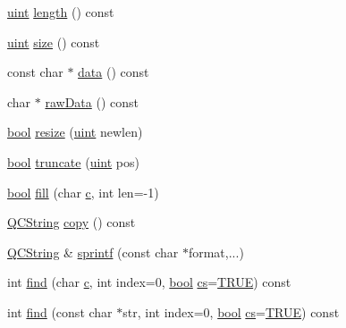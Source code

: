 \begin{DoxyCompactItemize}
\item 
\hyperlink{qglobal_8h_a4d3943ddea65db7163a58e6c7e8df95a}{uint} \hyperlink{class_q_c_string_a70bdaa04f2325aee395c4e1ccc1c942c}{length} () const 
\item 
\hyperlink{qglobal_8h_a4d3943ddea65db7163a58e6c7e8df95a}{uint} \hyperlink{class_q_c_string_aabd08432ddd836c2836b2ddfbfd8ed7c}{size} () const 
\item 
const char $\ast$ \hyperlink{class_q_c_string_a0079684d8dd531b96660e5ceefa3232d}{data} () const 
\item 
char $\ast$ \hyperlink{class_q_c_string_a94bb1d28e72852dec7547f5c8bad64bd}{raw\+Data} () const 
\item 
\hyperlink{qglobal_8h_a1062901a7428fdd9c7f180f5e01ea056}{bool} \hyperlink{class_q_c_string_a8402bb62a3a1c6a79130c3b3cf38b52c}{resize} (\hyperlink{qglobal_8h_a4d3943ddea65db7163a58e6c7e8df95a}{uint} newlen)
\item 
\hyperlink{qglobal_8h_a1062901a7428fdd9c7f180f5e01ea056}{bool} \hyperlink{class_q_c_string_a5644b56f807df5375dba545abca25f40}{truncate} (\hyperlink{qglobal_8h_a4d3943ddea65db7163a58e6c7e8df95a}{uint} pos)
\item 
\hyperlink{qglobal_8h_a1062901a7428fdd9c7f180f5e01ea056}{bool} \hyperlink{class_q_c_string_a2061c09e8d70cd279d9cc9feef33d2bb}{fill} (char \hyperlink{060__command__switch_8tcl_ab14f56bc3bd7680490ece4ad7815465f}{c}, int len=-\/1)
\item 
\hyperlink{class_q_c_string}{Q\+C\+String} \hyperlink{class_q_c_string_ad190e906eff00556159d23c8a1bec048}{copy} () const 
\item 
\hyperlink{class_q_c_string}{Q\+C\+String} \& \hyperlink{class_q_c_string_aa2dccf89cb25346c3ee81d75aa5859da}{sprintf} (const char $\ast$format,...)
\item 
int \hyperlink{class_q_c_string_a6259f9a38621b80b134601ad5c3fae74}{find} (char \hyperlink{060__command__switch_8tcl_ab14f56bc3bd7680490ece4ad7815465f}{c}, int index=0, \hyperlink{qglobal_8h_a1062901a7428fdd9c7f180f5e01ea056}{bool} \hyperlink{qtextcodec_8cpp_a067a00d3965ca879847daf3c8c224ee6}{cs}=\hyperlink{qglobal_8h_a04a6422a52070f0dc478693da640242b}{T\+R\+U\+E}) const 
\item 
int \hyperlink{class_q_c_string_a229c7d9d2f085a59d8d8651b63cdc222}{find} (const char $\ast$str, int index=0, \hyperlink{qglobal_8h_a1062901a7428fdd9c7f180f5e01ea056}{bool} \hyperlink{qtextcodec_8cpp_a067a00d3965ca879847daf3c8c224ee6}{cs}=\hyperlink{qglobal_8h_a04a6422a52070f0dc478693da640242b}{T\+R\+U\+E}) const 
\item 

\end{DoxyCompactItemize}
